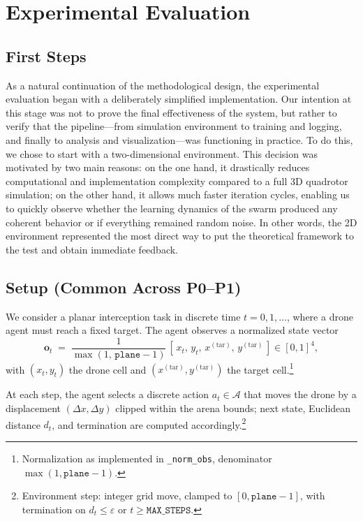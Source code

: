 \section{Experimental Evaluation}

    \subsection{First Steps}
        As a natural continuation of the methodological design, the experimental evaluation began with a deliberately simplified implementation. Our intention at this stage was not to prove the final effectiveness of the system, but rather to verify that the pipeline---from simulation environment to training and logging, and finally to analysis and visualization---was functioning in practice. To do this, we chose to start with a two-dimensional environment. This decision was motivated by two main reasons: on the one hand, it drastically reduces computational and implementation complexity compared to a full 3D quadrotor simulation; on the other hand, it allows much faster iteration cycles, enabling us to quickly observe whether the learning dynamics of the swarm produced any coherent behavior or if everything remained random noise. In other words, the 2D environment represented the most direct way to put the theoretical framework to the test and obtain immediate feedback.
        \medskip

    \subsection{Setup (Common Across P0--P1)}
        We consider a planar interception task in discrete time $t=0,1,\dots$, where a drone agent must reach a fixed target. The agent observes a normalized state vector
        \begin{equation}
            \label{eq:obs}
            \mathbf{o}_t \;=\; \frac{1}{\max(1,\,\texttt{plane}-1)}\,[\,x_t,\,y_t,\,x^{(\mathrm{tar})},\,y^{(\mathrm{tar})}\,] \in [0,1]^4,
        \end{equation}
        with $(x_t,y_t)$ the drone cell and $(x^{(\mathrm{tar})},y^{(\mathrm{tar})})$ the target cell.\footnote{Normalization as implemented in \texttt{\_norm\_obs}, denominator $\max(1,\texttt{plane}-1)$.} 
        \medskip
        
        At each step, the agent selects a discrete action $a_t\in\mathcal{A}$ that moves the drone by a displacement $(\Delta x,\Delta y)$ clipped within the arena bounds; next state, Euclidean distance $d_t$, and termination are computed accordingly.\footnote{Environment step: integer grid move, clamped to $[0,\texttt{plane}-1]$, with termination on $d_t\le\varepsilon$ or $t\ge\texttt{MAX\_STEPS}$.}


